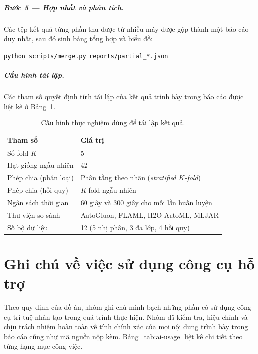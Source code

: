 \paragraph{Bước 5 --- Hợp nhất và phân tích.} Các tệp kết quả từng phần thu được
từ nhiều máy được gộp thành một báo cáo duy nhất, sau đó sinh bảng tổng hợp và
biểu đồ:
\begin{center}
\texttt{python scripts/merge.py reports/partial\_*.json}
\end{center}

\paragraph{Cấu hình tái lập.} Các tham số quyết định tính tái lập của kết quả
trình bày trong báo cáo được liệt kê ở Bảng~\ref{tab:cauhinh}.

\begin{table}[H]
  \centering
  \small
  \caption{Cấu hình thực nghiệm dùng để tái lập kết quả.}
  \label{tab:cauhinh}
  \renewcommand{\arraystretch}{1.2}
  \begin{tabularx}{\linewidth}{@{}l X@{}}
    \toprule
    \textbf{Tham số} & \textbf{Giá trị} \\
    \midrule
    Số fold $K$              & 5 \\
    Hạt giống ngẫu nhiên     & 42 \\
    Phép chia (phân loại)    & Phân tầng theo nhãn (\textit{stratified $K$-fold}) \\
    Phép chia (hồi quy)      & $K$-fold ngẫu nhiên \\
    Ngân sách thời gian      & 60 giây và 300 giây cho mỗi lần huấn luyện \\
    Thư viện so sánh         & AutoGluon, FLAML, H2O AutoML, MLJAR \\
    Số bộ dữ liệu            & 12 (5 nhị phân, 3 đa lớp, 4 hồi quy) \\
    \bottomrule
  \end{tabularx}
\end{table}

\chapter{Ghi chú về việc sử dụng công cụ hỗ trợ}
\label{ch:phuluc-ai}

Theo quy định của đồ án, nhóm ghi chú minh bạch những phần có sử dụng công cụ trí
tuệ nhân tạo trong quá trình thực hiện. Nhóm đã kiểm tra, hiệu chỉnh và chịu trách
nhiệm hoàn toàn về tính chính xác của mọi nội dung trình bày trong báo cáo cũng
như mã nguồn nộp kèm. Bảng~\ref{tab:ai-usage} liệt kê chi tiết theo từng hạng mục
công việc.

